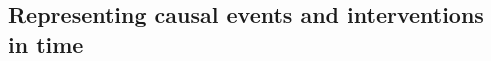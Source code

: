 \documentclass{cambridge7A}%
\begin{document}





\subsection{Representing causal events and interventions in time}
\end{document}
